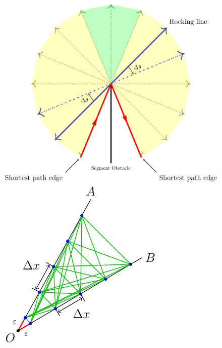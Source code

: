 \begin{figure}[H]
\centering
\begin{minipage}[t]{0.45\textwidth}
\includegraphics[width=\textwidth]{asy2d/rocking-line.pdf}
\end{minipage}
\begin{minipage}[t]{0.3\textwidth}
\includegraphics[width=\textwidth]{asy2d/bipartite-cone.pdf}

\end{minipage}
\end{figure}
